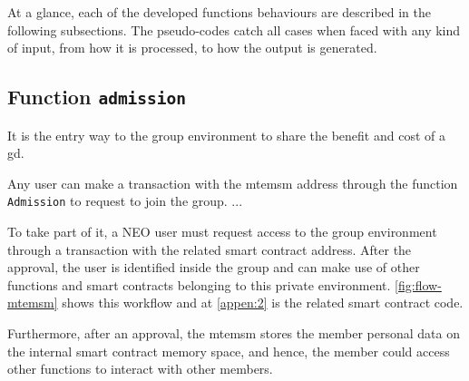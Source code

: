 At a glance, each of the developed functions behaviours are described in the following subsections.
The pseudo-codes catch all cases when faced with any kind of input, from how it is processed, to how the output is generated.





\subsection*{Function \texttt{admission}}

It is the entry way to the group environment to share the benefit and cost of a \gls{gd}.

Any user can make a transaction with the \gls{mtemsm} address through the function \verb|Admission| to request to join the group.
...

To take part of it, a NEO user must request access to the group environment through a transaction with the related smart contract address.
After the approval, the user is identified inside the group and can make use of other functions and smart contracts belonging to this private environment.
\autoref{fig:flow-mtemsm} shows this workflow and at \autoref{appen:2} is the related smart contract code.

Furthermore, after an approval, the \gls{mtemsm} stores the member personal data on the internal smart contract memory space, and hence, the member could access other functions to interact with other members.

